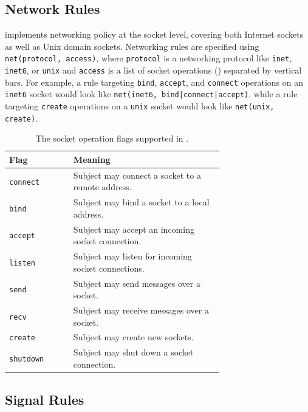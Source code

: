\subsection{Network Rules}%
\label{ss:bpfbox-network-rules}

\bpfbox{} implements networking policy at the socket level, covering both Internet sockets
as well as Unix domain sockets. Networking rules are specified using
\lstinline[language=bpfbox]{net(protocol, access)}, where
\lstinline[language=bpfbox]{protocol} is a networking protocol like \texttt{inet},
\texttt{inet6}, or \texttt{unix} and \lstinline[language=bpfbox]{access} is a list of
socket operations () separated by vertical bars. For example, a rule
targeting \texttt{bind}, \texttt{accept}, and \texttt{connect} operations on an
\texttt{inet6} socket would look like \lstinline[language=bpfbox]{net(inet6, bind|connect|accept)},
while a rule targeting \texttt{create} operations on a \texttt{unix} socket would look
like \lstinline[language=bpfbox]{net(unix, create)}.

\begin{table}[htpb]
    \centering
    \caption{The socket operation flags supported in \bpfbox{}.}
    \label{tab:net-access}
    \begin{tabular}{lp{0.7\linewidth}}
    \toprule
    Flag & Meaning \\
    \midrule
    \texttt{connect}  & Subject may connect a socket to a remote address. \\
    \texttt{bind}     & Subject may bind a socket to a local address. \\
    \texttt{accept}   & Subject may accept an incoming socket connection. \\
    \texttt{listen}   & Subject may listen for incoming socket connections. \\
    \texttt{send}     & Subject may send messages over a socket. \\
    \texttt{recv}     & Subject may receive messages over a socket. \\
    \texttt{create}   & Subject may create new sockets. \\
    \texttt{shutdown} & Subject may shut down a socket connection. \\
    \bottomrule
    \end{tabular}
\end{table}



\subsection{Signal Rules}%
\label{ss:bpfbox-signal-rules}

